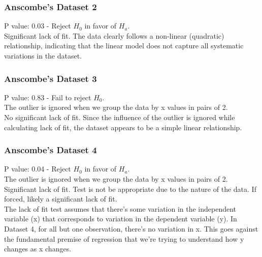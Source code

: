 \documentclass[12pt]{article}
\begin{document}
\subsubsection*{Anscombe's Dataset 2}
P value: 0.03 - Reject \(H_0\) in favor of \(H_a\).
\\
Significant lack of fit. The data clearly follows a non-linear (quadratic)
relationship, indicating that the linear model does not capture all systematic
variations in the dataset.

\subsubsection*{Anscombe's Dataset 3}
P value: 0.83 - Fail to reject \(H_0\).
\\
The outlier is ignored when we group the data by x values in pairs of 2.
\\
No significant lack of fit. Since the influence of the outlier is ignored while
calculating lack of fit, the dataset appears to be a simple linear relationship.

\subsubsection*{Anscombe's Dataset 4}
P value: 0.04 - Reject \(H_0\) in favor of \(H_a\).
\\
The outlier is ignored when we group the data by x values in pairs of 2.
\\
Significant lack of fit. Test is not be appropriate due to the nature of the data.
If forced, likely a significant lack of fit.
\\[\baselineskip]
The lack of fit test assumes that there's some variation in the independent variable (x)
that corresponds to variation in the dependent variable (y).
In Dataset 4, for all but one observation, there's no variation in x.
This goes against the fundamental premise of regression that
we're trying to understand how y changes as x changes.

\newpage
\end{document}
